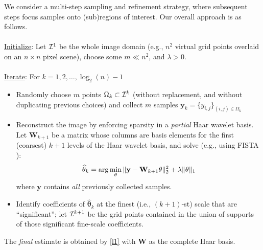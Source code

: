 \documentclass[landscape,final,a0paper,fontscale=0.33]{baposter}
\begin{document}
\begin{poster}
{{\noindent We consider a multi-step sampling and refinement strategy, where subsequent steps focus samples onto (sub)regions of interest. Our overall approach is as follows. \\
\\
\underline{Initialize}: Let ${\cal I}^1$ be the whole image domain (e.g., $n^2$ virtual grid points overlaid on an $n\times n$ pixel scene), choose some $m \ll n^2$, and $\lambda > 0$.\\
\\
\underline{Iterate}: For $k=1,2,\dots,\log_2(n)-1$
\begin{itemize}
\item Randomly choose $m$ points $\Omega_k \subset {\cal I}^k$ (without replacement, and without duplicating previous choices) and collect $m$ samples $\mathbf{y}_k = \{y_{i,j}\}_{(i,j)\in\Omega_k}$
\item Reconstruct the image by enforcing sparsity in a \emph{partial} Haar wavelet basis.  Let $\mathbf{W}_{k+ 1}$ be a matrix whose columns are basis elements for the first (coarsest) $k+1$ levels of the Haar wavelet basis, and solve (e.g., using FISTA \cite{beck2009fast}):\vspace{-0.3em}
\begin{equation}\label{l1}
\hat{\mathbf{\theta}}_k = \arg \min_{\mathbf{\theta}} \|\mathbf{y} - \mathbf{W}_{k+1}\mathbf{\theta}\|_2^2 + \lambda \|\mathbf{\theta}\|_1  \vspace{-0.3em}
\end{equation}
 where $\mathbf{y}$ contains \emph{all} previously collected samples.
\item Identify coefficients of $\hat{\mathbf{\theta}}_k$ at the finest (i.e., $(k+1)$-st) scale that are ``significant''; let ${\cal I}^{k+1}$ be the grid points contained in the union of supports of those significant fine-scale coefficients.
\end{itemize}
The \emph{final} estimate is obtained by \eqref{l1} with $\mathbf{W}$ as the complete Haar basis.

          }
}


\end{poster}
\end{document}
